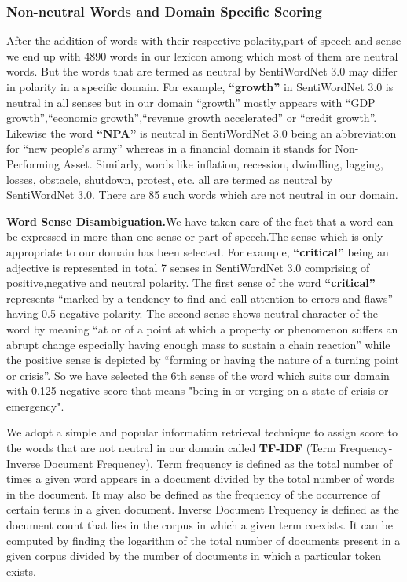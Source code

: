\documentclass[a4paper, 10pt, conference]{ieeeconf}
\begin{document}
	\subsubsection{Non-neutral Words and Domain Specific Scoring}
	After the addition of words with their respective polarity,part of speech and sense we end up with 4890 words in our lexicon among which most of them are neutral words. But the words that are termed as neutral by SentiWordNet 3.0 may differ in polarity in a specific domain. For example, \textbf{``growth''} in SentiWordNet 3.0 is neutral in all senses but in our domain ``growth'' mostly appears with ``GDP growth'',``economic growth'',``revenue growth accelerated'' or ``credit growth''. Likewise the word \textbf{``NPA''} is neutral in SentiWordNet 3.0 being an abbreviation for ``new people's army'' whereas in a financial domain it stands for Non-Performing Asset. Similarly, words like inflation, recession, dwindling, lagging, losses, obstacle, shutdown, protest, etc. all are termed as neutral by SentiWordNet 3.0. There are 85 such words which are not neutral in our domain.
	
	\textbf{Word Sense Disambiguation.}We have taken care of the fact that a word can be expressed in more than one sense or part of speech.The sense which is only appropriate to our domain has been selected. For example, \textbf{``critical''} being an adjective is represented in total 7 senses in SentiWordNet 3.0 comprising of positive,negative and neutral polarity. The first sense of the word \textbf{``critical''} represents ``marked by a tendency to find and call attention to errors and flaws'' having 0.5 negative polarity. The second sense shows neutral character of the word by meaning ``at or of a point at which a property or phenomenon suffers an abrupt change especially having enough mass to sustain a chain reaction'' while the positive sense is depicted by ``forming or having the nature of a turning point or crisis''. So we have selected the 6th sense of the word which suits our domain with 0.125 negative score that means "being in or verging on a state of crisis or emergency".
		
	We adopt a simple and popular information retrieval technique to assign score to the words that are not neutral in our domain called \textbf{TF-IDF} (Term Frequency-Inverse
	Document Frequency)\cite{c12}. Term frequency is defined as the total number of times a given word appears
	in a document divided by the total number of words in the document. It may also be defined as the
	frequency of the occurrence of certain terms in a given document. Inverse Document Frequency is defined as the
	document count that lies in the corpus in which a given term coexists.
	It can be computed by finding the logarithm of the total number of documents
	present in a given corpus divided by the number of documents in which a particular
	token exists.
	
\end{document}

